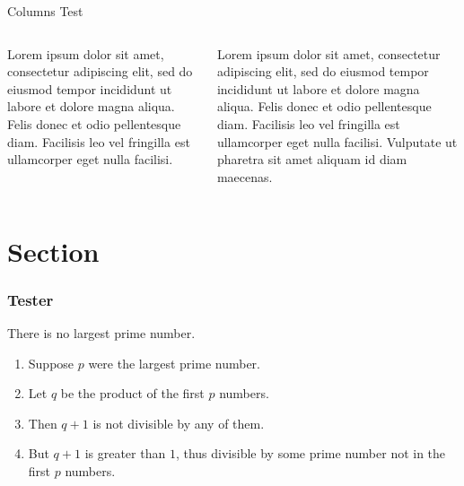 \documentclass[aspectratio=169, table]{beamer}
\begin{document}
	\begin{frame}{Columns Test}
		\begin{tcolorbox}[standard jigsaw, opacityback=0, opacityframe=0, sharp corners, boxrule=0pt]
			\begin{columns}[T] %
				\begin{column}{0.5\textwidth}
					Lorem ipsum dolor sit amet, consectetur adipiscing elit, sed do eiusmod tempor incididunt ut labore et dolore magna aliqua. Felis donec et odio pellentesque diam. Facilisis leo vel fringilla est ullamcorper eget nulla facilisi.
				\end{column}
				\begin{column}{0.5\textwidth}
					Lorem ipsum dolor sit amet, consectetur adipiscing elit, sed do eiusmod tempor incididunt ut labore et dolore magna aliqua. Felis donec et odio pellentesque diam. Facilisis leo vel fringilla est ullamcorper eget nulla facilisi. Vulputate ut pharetra sit amet aliquam id diam maecenas.
				\end{column}
			\end{columns}
		\end{tcolorbox}
	\end{frame}

	\section{Section}
	\begin{frame} 
		\frametitle{Tester} 
		\begin{theorem}
			There is no largest prime number. \end{theorem} 
		\begin{enumerate} 
			\item<1-| alert@1> Suppose $p$ were the largest prime number. 
			\item<2-> Let $q$ be the product of the first $p$ numbers. 
			\item<3-> Then $q+1$ is not divisible by any of them. 
			\item<1-> But $q + 1$ is greater than $1$, thus divisible by some prime
			number not in the first $p$ numbers.
		\end{enumerate}
	\end{frame}
\end{document}

